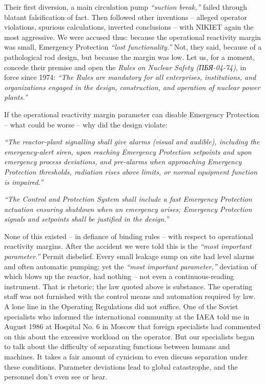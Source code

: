\documentclass[openright]{bookest}
\begin{document}
Their first diversion, a main circulation pump \textit{``suction break,''} failed through blatant falsification of fact. Then followed other inventions -- alleged operator violations, spurious calculations, inverted conclusions -- with NIKIET again the most aggressive. We were accused thus: because the operational reactivity margin was small, Emergency Protection \textit{``lost functionality.''} Not, they said, because of a pathological rod design, but because the margin was low. Let us, for a moment, concede their premise and open the \textit{Rules on Nuclear Safety (ПБЯ-04-74)}, in force since 1974: \textit{``The Rules are mandatory for all enterprises, institutions, and organizations engaged in the design, construction, and operation of nuclear power plants.''}

If the operational reactivity margin parameter can disable Emergency Protection -- what could be worse -- why did the design violate:

\begin{personal}
\textit{``The reactor-plant signalling shall give alarms (visual and audible), including the emergency-alert siren, upon reaching Emergency Protection setpoints and upon emergency process deviations, and pre-alarms when approaching Emergency Protection thresholds, radiation rises above limits, or normal equipment function is impaired.''}
\end{personal}

\begin{personal}
\textit{``The Control and Protection System shall include a fast Emergency Protection actuation ensuring shutdown when an emergency arises; Emergency Protection signals and setpoints shall be justified in the design.''}
\end{personal}

None of this existed -- in defiance of binding rules -- with respect to operational reactivity margins. After the accident we were told this is the \textit{``most important parameter.''} Permit disbelief. Every small leakage sump on site had level alarms and often automatic pumping; yet the \textit{``most important parameter,''} deviation of which blows up the reactor, had nothing -- not even a continuous-reading instrument. That is rhetoric; the law quoted above is substance. The operating staff was not furnished with the control means and automation required by law. A lone line in the Operating Regulations did not suffice. One of the Soviet specialists who informed the international community at the IAEA told me in August 1986 at Hospital No. 6 in Moscow that foreign specialists had commented on this about the excessive workload on the operator. But our specialists began to talk about the difficulty of separating functions between humans and machines. It takes a fair amount of cynicism to even discuss separation under these conditions. Parameter deviations lead to global catastrophe, and the personnel don't even see or hear.
\end{document}
